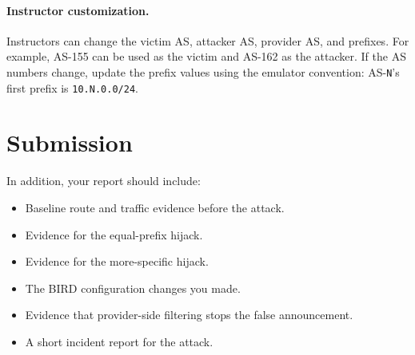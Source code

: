 \paragraph{Instructor customization.}
Instructors can change the victim AS, attacker AS, provider AS, and prefixes.
For example, AS-155 can be used as the victim and AS-162 as the attacker. If
the AS numbers change, update the prefix values using the emulator convention:
AS-\texttt{N}'s first prefix is \texttt{10.N.0.0/24}.


\section{Submission}



In addition, your report should include:

\begin{itemize}[noitemsep]
\item Baseline route and traffic evidence before the attack.
\item Evidence for the equal-prefix hijack.
\item Evidence for the more-specific hijack.
\item The BIRD configuration changes you made.
\item Evidence that provider-side filtering stops the false announcement.
\item A short incident report for the attack.
\end{itemize}


